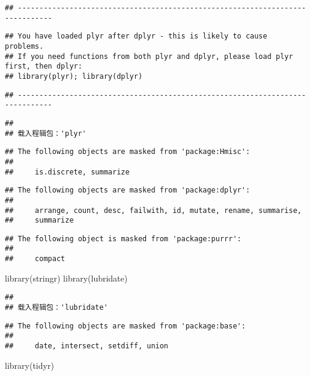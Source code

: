 \documentclass[
]{article}
\newenvironment{Shaded}{\begin{snugshade}}{\end{snugshade}}
\newcommand{\FunctionTok}[1]{\textcolor[rgb]{0.00,0.00,0.00}{#1}}
\newcommand{\NormalTok}[1]{#1}
\begin{document}
\begin{verbatim}
## ------------------------------------------------------------------------------
\end{verbatim}

\begin{verbatim}
## You have loaded plyr after dplyr - this is likely to cause problems.
## If you need functions from both plyr and dplyr, please load plyr first, then dplyr:
## library(plyr); library(dplyr)
\end{verbatim}

\begin{verbatim}
## ------------------------------------------------------------------------------
\end{verbatim}

\begin{verbatim}
## 
## 载入程辑包：'plyr'
\end{verbatim}

\begin{verbatim}
## The following objects are masked from 'package:Hmisc':
## 
##     is.discrete, summarize
\end{verbatim}

\begin{verbatim}
## The following objects are masked from 'package:dplyr':
## 
##     arrange, count, desc, failwith, id, mutate, rename, summarise,
##     summarize
\end{verbatim}

\begin{verbatim}
## The following object is masked from 'package:purrr':
## 
##     compact
\end{verbatim}

\begin{Shaded}
\begin{Highlighting}[]
\FunctionTok{library}\NormalTok{(stringr)}
\FunctionTok{library}\NormalTok{(lubridate)}
\end{Highlighting}
\end{Shaded}

\begin{verbatim}
## 
## 载入程辑包：'lubridate'
\end{verbatim}

\begin{verbatim}
## The following objects are masked from 'package:base':
## 
##     date, intersect, setdiff, union
\end{verbatim}

\begin{Shaded}
\begin{Highlighting}[]
\FunctionTok{library}\NormalTok{(tidyr)}
\end{Highlighting}
\end{Shaded}
\end{document}
